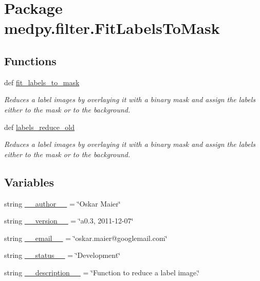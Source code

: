 \hypertarget{namespacemedpy_1_1filter_1_1FitLabelsToMask}{
\section{Package medpy.filter.FitLabelsToMask}
\label{namespacemedpy_1_1filter_1_1FitLabelsToMask}
}
\subsection*{Functions}
\begin{DoxyCompactItemize}
\item 
def \hyperlink{namespacemedpy_1_1filter_1_1FitLabelsToMask_ac658b410944e933f06d007d5adadeba8}{fit\_\-labels\_\-to\_\-mask}
\begin{DoxyCompactList}\small\item\em Reduces a label images by overlaying it with a binary mask and assign the labels either to the mask or to the background. \end{DoxyCompactList}\item 
def \hyperlink{namespacemedpy_1_1filter_1_1FitLabelsToMask_a2bfac9a3a1e91985b2a43ca691fed7a2}{labels\_\-reduce\_\-old}
\begin{DoxyCompactList}\small\item\em Reduces a label images by overlaying it with a binary mask and assign the labels either to the mask or to the background. \end{DoxyCompactList}\end{DoxyCompactItemize}
\subsection*{Variables}
\begin{DoxyCompactItemize}
\item 
string \hyperlink{namespacemedpy_1_1filter_1_1FitLabelsToMask_ae26e3790a04cc0ee264f09e66a7a4933}{\_\-\_\-author\_\-\_\-} = \char`\"{}Oskar Maier\char`\"{}
\item 
string \hyperlink{namespacemedpy_1_1filter_1_1FitLabelsToMask_a9b5e0789e1a56f91bbe74397bd9563c8}{\_\-\_\-version\_\-\_\-} = \char`\"{}a0.3, 2011-\/12-\/07\char`\"{}
\item 
string \hyperlink{namespacemedpy_1_1filter_1_1FitLabelsToMask_afae1d23917541703be77c64e12902f3e}{\_\-\_\-email\_\-\_\-} = \char`\"{}oskar.maier@googlemail.com\char`\"{}
\item 
string \hyperlink{namespacemedpy_1_1filter_1_1FitLabelsToMask_a6f6e618d04ee0cddebee953d93787ddc}{\_\-\_\-status\_\-\_\-} = \char`\"{}Development\char`\"{}
\item 
string \hyperlink{namespacemedpy_1_1filter_1_1FitLabelsToMask_ae5c7315609bfb89fea11b766377a9568}{\_\-\_\-description\_\-\_\-} = \char`\"{}Function to reduce a label image.\char`\"{}
\end{DoxyCompactItemize}


